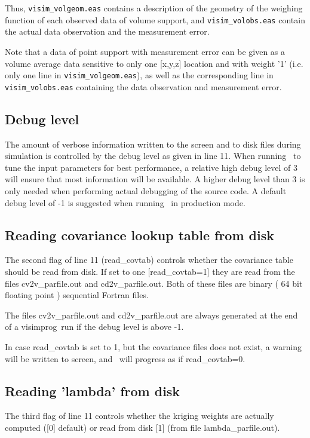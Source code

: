 \documentclass[12t]{article}
\begin{document}
Thus,  \texttt{visim\_volgeom.eas} contains a description of the geometry of the weighing function of each observed data of volume support, and  \texttt{visim\_volobs.eas} contain the actual data observation and the measurement error.

Note that a data of point support with measurement error can be given as a volume average data sensitive to only one [x,y,z] location and with weight '1' (i.e. only one line in \texttt{visim\_volgeom.eas}), as well as the corresponding line in \texttt{visim\_volobs.eas} containing the data observation and measurement error.  

\subsection{Debug level}
The amount of verbose information written to the screen and to disk
files during simulation is controlled by the debug level as given in
line 11. When running \visimprog~to tune the input parameters for best
performance, a relative high debug level of 3 will ensure that most
information will be available. A higher debug level than 3 is only
needed when performing actual debugging of the source code.
A default debug level of -1 is suggested when running \visimprog~in
production mode.

\subsection{Reading covariance lookup table from disk}
The second flag of line 11 (read\_covtab) controls whether the covariance table should be read from disk. If set to one [read\_covtab=1] they are read from the files cv2v\_parfile.out and cd2v\_parfile.out. Both of these files are binary ( 64 bit floating point ) sequential Fortran files.

The files cv2v\_parfile.out and cd2v\_parfile.out are always generated at the end of a visimprog~run if the debug level is above -1.

In case read\_covtab is set to 1, but the covariance files does not exist, a warning will be written to screen, and \visimprog~will progress as if read\_covtab=0.
 

\subsection{Reading 'lambda' from disk}
The third flag of line 11 controls whether the kriging weights are actually computed ([0] default) or read from disk [1] (from file lambda\_parfile.out).
\end{document}
